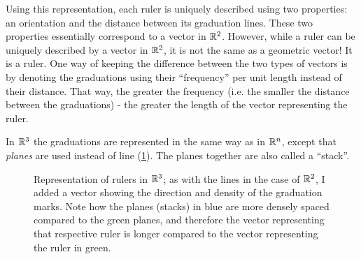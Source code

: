 Using this representation, each ruler is uniquely described using two properties: an orientation and the distance between its graduation lines. These two properties essentially correspond to a vector in $\Rs[2]$. However, while a ruler can be uniquely described by a vector in $\Rs[2]$, it is not the same as a geometric vector! It is a ruler. One way of keeping the difference between the two types of vectors is by denoting the graduations using their \enquote{frequency} per unit length instead of their distance. That way, the greater the frequency (i.e. the smaller the distance between the graduations) - the greater the length of the vector representing the ruler.

In $\Rs[3]$ the graduations are represented in the same way as in $\Rs[n]$, except that \textit{planes} are used instead of line (\cref{fig:rulers_3D}). The planes together are also called a \enquote{stack}.

\begin{figure}
    \begin{center}
        \hfill
    \end{center}
    \caption{Representation of rulers in $\Rs[3]$; as with the lines in the case of $\Rs[2]$, I added a vector showing the direction and density of the graduation marks. Note how the planes (stacks) in blue are more densely spaced compared to the green planes, and therefore the vector representing that respective ruler is longer compared to the vector representing the ruler in green.}
    \label{fig:rulers_3D}
\end{figure}

